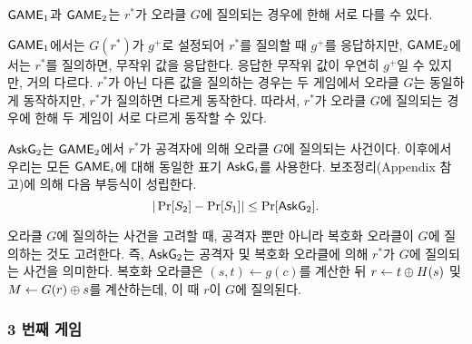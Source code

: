 $\textsf{GAME}_1$과 $\textsf{GAME}_2$는 $r^*$가 오라클 $G$에 질의되는 경우에 한해 서로 다를 수
있다. 

\begin{memo}
	$\textsf{GAME}_1$에서는 $G(r^*)$가 $g^+$로 설정되어 $r^*$를 질의할 때 $g^+$를
	응답하지만, $\textsf{GAME}_2$에서는 $r^*$를 질의하면, 무작위 값을 응답한다. 응답한
	무작위 값이 우연히 $g^+$일 수 있지만, 거의 다르다. $r^*$가 아닌 다른 값을
	질의하는 경우는 두 게임에서 오라클 $G$는 동일하게 동작하지만, $r^*$가
	질의하면 다르게 동작한다. 따라서, $r^*$가 오라클 $G$에 질의되는 경우에 한해
	두 게임이 서로 다르게 동작할 수 있다.
\end{memo}

$\textsf{AskG}_2$는 $\textsf{GAME}_2$에서 $r^*$가 공격자에 의해 오라클 $G$에 질의되는 사건이다.
이후에서 우리는 모든 $\textsf{GAME}_i$에 대해 동일한 표기 $\textsf{AskG}_i$를 사용한다.
보조정리(Appendix 참고)에 의해 다음 부등식이 성립한다.
$$
	|\Pr[S_2] - \Pr[S_1]| \leq \Pr[\textsf{AskG}_2].
$$

\begin{memo}
	오라클 $G$에 질의하는 사건을 고려할 때, 공격자 뿐만 아니라 복호화 오라클이
	$G$에 질의하는 것도 고려한다. 즉, $\textsf{AskG}_2$는 공격자 및 복호화 오라클에 의해
	$r^*$가 $G$에 질의되는 사건을 의미한다. 복호화 오라클은 $(s, t) \gets
	g(c)$를 계산한 뒤 $r \gets t \oplus H(s)$ 및 $M \gets G(r) \oplus s$를
	계산하는데, 이 때 $r$이 $G$에 질의된다.
\end{memo}

\newpage
\subsubsection{3 번째 게임}

